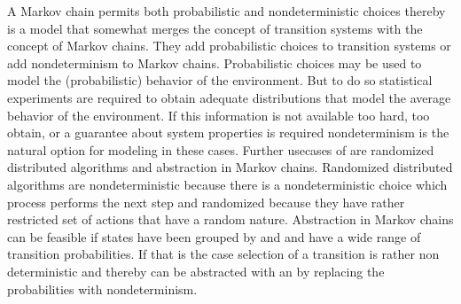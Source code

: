 \documentclass[preview]{standalone}
\begin{document}
A Markov chain permits both probabilistic and nondeterministic choices thereby is a model that somewhat merges the concept of transition systems with the concept of Markov chains. They add probabilistic choices to transition systems or add nondeterminism to Markov chains. Probabilistic choices may be used to model the (probabilistic) behavior of the environment. But to do so statistical experiments are required to obtain adequate distributions that model the average behavior of the environment. If this information is not available too hard, too obtain, or a guarantee about system properties is required nondeterminism is the natural option for modeling in these cases. Further usecases of \mdpsN are randomized distributed algorithms and abstraction in Markov chains. Randomized distributed algorithms are nondeterministic because there is a nondeterministic choice which process performs the next step and randomized because they have rather restricted set of actions that have a random nature. Abstraction in Markov chains can be feasible if states have been grouped by \atomicprops and and have a wide range of transition probabilities. If that is the case selection of a transition is rather non deterministic and thereby can be abstracted with an \mdpN by replacing the probabilities with nondeterminism.
%
%
\end{document}
